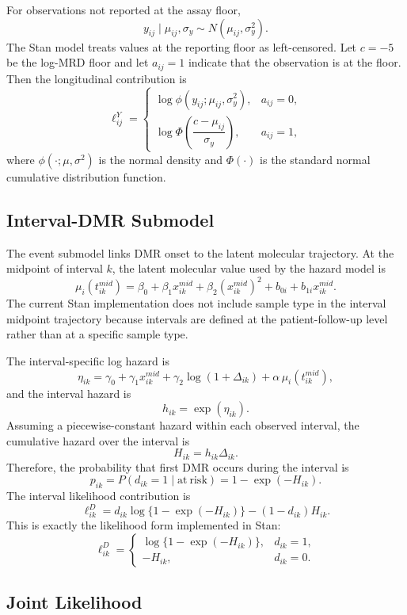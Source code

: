 For observations not reported at the assay floor,
\[
y_{ij}\mid \mu_{ij},\sigma_y \sim N(\mu_{ij},\sigma_y^2).
\]
The Stan model treats values at the reporting floor as left-censored. Let \(c=-5\) be the log-MRD floor and let \(a_{ij}=1\) indicate that the observation is at the floor. Then the longitudinal contribution is
\[
\ell^{Y}_{ij} =
\begin{cases}
\log \phi(y_{ij};\mu_{ij},\sigma_y^2), & a_{ij}=0,\\
\log \Phi\left(\dfrac{c-\mu_{ij}}{\sigma_y}\right), & a_{ij}=1,
\end{cases}
\]
where \(\phi(\cdot;\mu,\sigma^2)\) is the normal density and \(\Phi(\cdot)\) is the standard normal cumulative distribution function.

\subsection{Interval-DMR Submodel}

The event submodel links DMR onset to the latent molecular trajectory. At the midpoint of interval \(k\), the latent molecular value used by the hazard model is
\[
\mu_i(t^{mid}_{ik})
=\beta_0+\beta_1x^{mid}_{ik}+\beta_2(x^{mid}_{ik})^2
+b_{0i}+b_{1i}x^{mid}_{ik}.
\]
The current Stan implementation does not include sample type in the interval midpoint trajectory because intervals are defined at the patient-follow-up level rather than at a specific sample type.

The interval-specific log hazard is
\[
\eta_{ik}
=\gamma_0+\gamma_1x^{mid}_{ik}
+\gamma_2\log(1+\Delta_{ik})
+\alpha\,\mu_i(t^{mid}_{ik}),
\]
and the interval hazard is
\[
h_{ik}=\exp(\eta_{ik}).
\]
Assuming a piecewise-constant hazard within each observed interval, the cumulative hazard over the interval is
\[
H_{ik}=h_{ik}\Delta_{ik}.
\]
Therefore, the probability that first DMR occurs during the interval is
\[
p_{ik}
=P(d_{ik}=1\mid\mathrm{at\ risk})
=1-\exp(-H_{ik}).
\]
The interval likelihood contribution is
\[
\ell^{D}_{ik}
=d_{ik}\log\{1-\exp(-H_{ik})\}-(1-d_{ik})H_{ik}.
\]
This is exactly the likelihood form implemented in Stan:
\[
\ell^{D}_{ik} =
\begin{cases}
\log\{1-\exp(-H_{ik})\}, & d_{ik}=1,\\
-H_{ik}, & d_{ik}=0.
\end{cases}
\]

\subsection{Joint Likelihood}

